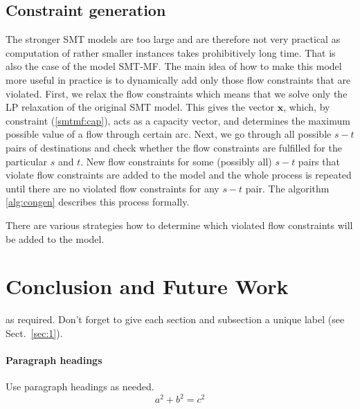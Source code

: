 \subsection{Constraint generation}
The stronger SMT models are too large and are therefore not very practical as computation of rather smaller instances takes prohibitively long time. That is also the case of the model SMT-MF. The main idea of how to make this model more useful in practice is to dynamically add only those flow constraints that are violated. First, we relax the flow constraints which means that we solve only the LP relaxation of the original SMT model. This gives the vector $\mathbf{x}$, which, by constraint (\ref{smtmf:cap}), acts as a capacity vector, and determines the maximum possible value of a flow through certain arc. Next, we go through all possible $s-t$ pairs of destinations and check whether the flow constraints are fulfilled for the particular $s$ and $t$. New flow constraints for some (possibly all) $s-t$ pairs that violate flow constraints are added to the model and the whole process is repeated until there are no violated flow constraints for any $s-t$ pair. The algorithm \ref{alg:congen} describes this process formally.


There are various strategies how to determine which violated flow constraints will be added to the model. 

\section{Conclusion and Future Work}
\label{sec:2}
as required. Don't forget to give each section
and subsection a unique label (see Sect.~\ref{sec:1}).
\paragraph{Paragraph headings} Use paragraph headings as needed.
\begin{equation}
a^2+b^2=c^2
\end{equation}


